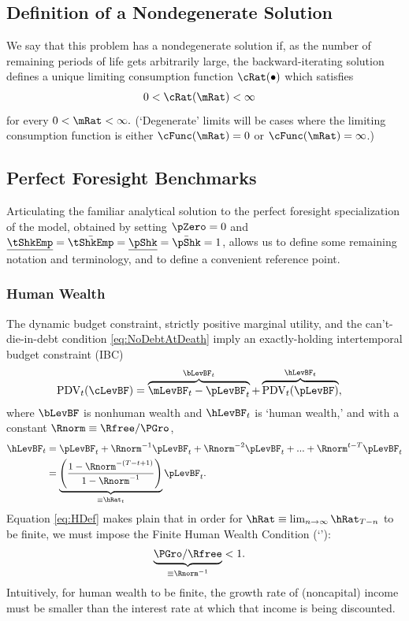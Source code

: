 \documentclass[BufferStockTheory]{subfiles}
\begin{document}
\hypertarget{Definition-of-a-Nondegenerate-Solution}{}
\subsection{Definition of a Nondegenerate Solution}

We say that this problem has a nondegenerate solution if, as the number of remaining periods of life gets arbitrarily large, the backward-iterating solution defines a unique limiting consumption function $\cRat(\bullet)$ which satisfies
\begin{align}
  0 & < \cRat(\mRat) <  \infty 
\end{align}
for every $0 < \mRat < \infty.$ (`Degenerate' limits will be cases
where the limiting consumption function is either $\cFunc(\mRat)=0$ or $\cFunc(\mRat)=\infty$.)

\hypertarget{Perfect-Foresight-Benchmarks}{}
\subsection{Perfect Foresight Benchmarks}

Articulating the familiar analytical solution to the perfect foresight specialization of the model, obtained by setting $\pZero=0$ and $\ushort{\tShkEmp}=\bar{\tShkEmp}=\ushort{\pShk}=\bar{\pShk}=1$, allows us to define some remaining notation and terminology, and to define a convenient reference point.

\hypertarget{Human-Wealth}{}
\subsubsection{Human Wealth}
The dynamic budget constraint, strictly positive marginal utility, and the can't-die-in-debt condition \eqref{eq:NoDebtAtDeath} imply an exactly-holding intertemporal budget constraint (IBC)
\begin{align}
  \text{PDV}_{t}(\cLevBF)  & = \overbrace{\mLevBF_{t}-\pLevBF_{t}}^{\bLevBF_{t}}+\overbrace{\text{PDV}_{t}(\pLevBF)}^{\hLevBF_{t}}, \label{eq:IBCFinite}
\end{align}
where $\bLevBF$ is nonhuman wealth and $\hLevBF_{t}$ is `human wealth,' and with a constant $\Rnorm \equiv \Rfree/\PGro$,
\begin{align}
  \hLevBF_{t}  & = \pLevBF_{t}+\Rnorm^{-1} \pLevBF_{t} + \Rnorm^{-2} \pLevBF_{t} + ... + \Rnorm^{t-T} \pLevBF_{t} \notag
  \\  & = \underbrace{\left(\frac{1-\Rnorm^{-(T-t+1)}}{1-\Rnorm^{-1}}\right)}_{\equiv \hRat_{t}}\pLevBF_{t} \label{eq:HDef}.
\end{align}
Equation \eqref{eq:HDef} makes plain that in order for $\hRat \equiv \lim_{n \rightarrow
  \infty} \hRat_{T-n}$ to be finite, we must
impose the Finite Human Wealth Condition (`\FHWC'): \hypertarget{FHWC}{}
\begin{align}
  \underbrace{\PGro/\Rfree}_{\equiv \Rnorm^{-1}}  & < 1 \label{eq:FHWC}.
\end{align}
Intuitively, for human wealth to be finite, the growth rate of (noncapital) income must be smaller than
the interest rate at which that income is being discounted.
\end{document}
